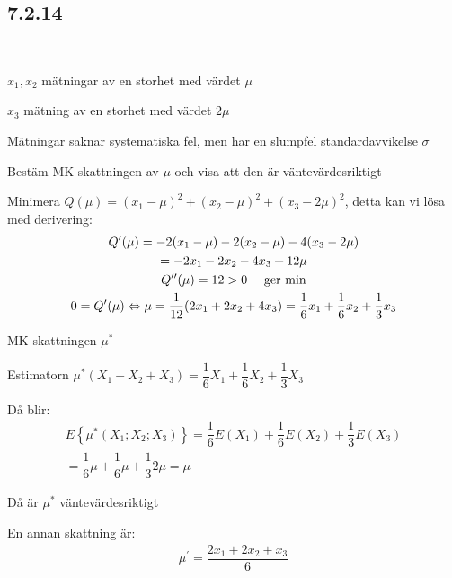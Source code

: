 \subsection{7.2.14}\hfill\\\par
\noindent $x_1,x_2$ mätningar av en storhet med värdet $\mu$\par
\noindent $x_3$ mätning av en storhet med värdet $2\mu$\par
\noindent Mätningar saknar systematiska fel, men har en slumpfel standardavvikelse $\sigma$
\par\bigskip
\noindent Bestäm MK-skattningen av $\mu$ och visa att den är väntevärdesriktigt
\par\bigskip
\noindent Minimera $Q(\mu) = (x_1-\mu)^2+(x_2-\mu)^2+(x_3-2\mu)^2$, detta kan vi lösa med derivering:
\begin{equation*}
  \begin{gathered}
    Q^{\prime}(\mu) = -2(x_1-\mu)-2(x_2-\mu)-4(x_3-2\mu)\\
    = -2x_1-2x_2-4x_3+12\mu\\
    Q^{\prime\prime}(\mu) = 12>0\quad\text{ ger min}\\
    0 = Q^{\prime}(\mu) \Leftrightarrow \mu = \dfrac{1}{12}(2x_1+2x_2+4x_3) = \dfrac{1}{6}x_1+\dfrac{1}{6}x_2+\dfrac{1}{3}x_3
  \end{gathered}
\end{equation*}
\par\bigskip
\noindent MK-skattningen $\mu^*$\par
\noindent Estimatorn $\mu^*(X_1+X_2+X_3) = \dfrac{1}{6}X_1+\dfrac{1}{6}X_2+\dfrac{1}{3}X_3$\par
\noindent Då blir:
\begin{equation*}
  \begin{gathered}
    E\left\{\mu^*(X_1;X_2;X_3)\right\} = \dfrac{1}{6}E(X_1)+\dfrac{1}{6}E(X_2)+\dfrac{1}{3}E(X_3)\\
    = \dfrac{1}{6}\mu+\dfrac{1}{6}\mu+\dfrac{1}{3}2\mu = \mu
  \end{gathered}
\end{equation*}\par
\noindent Då är $\mu^*$ väntevärdesriktigt
\par\bigskip
\noindent En annan skattning är:
\begin{equation*}
  \begin{gathered}
    \mu^{\prime} = \dfrac{2x_1+2x_2+x_3}{6}
  \end{gathered}
\end{equation*}\par
